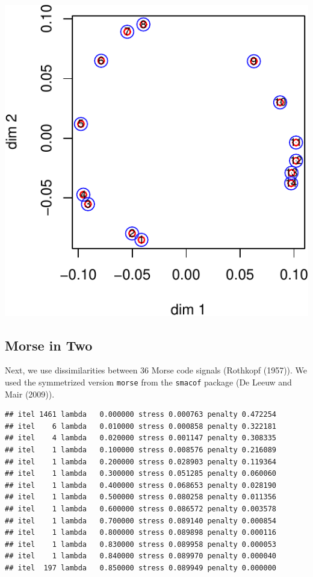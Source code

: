 \documentclass[
  12pt,
]{article}
\begin{document}
\begin{center}\includegraphics{penalty_files/figure-latex/okman-1} \end{center}

\subsection{Morse in Two}\label{morse-in-two}

Next, we use dissimilarities between 36 Morse code signals (Rothkopf
(1957)). We used the symmetrized version \texttt{morse} from the
\texttt{smacof} package (De Leeuw and Mair (2009)).

\begin{verbatim}
## itel 1461 lambda   0.000000 stress 0.000763 penalty 0.472254 
## itel    6 lambda   0.010000 stress 0.000858 penalty 0.322181 
## itel    4 lambda   0.020000 stress 0.001147 penalty 0.308335 
## itel    1 lambda   0.100000 stress 0.008576 penalty 0.216089 
## itel    1 lambda   0.200000 stress 0.028903 penalty 0.119364 
## itel    1 lambda   0.300000 stress 0.051285 penalty 0.060060 
## itel    1 lambda   0.400000 stress 0.068653 penalty 0.028190 
## itel    1 lambda   0.500000 stress 0.080258 penalty 0.011356 
## itel    1 lambda   0.600000 stress 0.086572 penalty 0.003578 
## itel    1 lambda   0.700000 stress 0.089140 penalty 0.000854 
## itel    1 lambda   0.800000 stress 0.089898 penalty 0.000116 
## itel    1 lambda   0.830000 stress 0.089958 penalty 0.000053 
## itel    1 lambda   0.840000 stress 0.089970 penalty 0.000040 
## itel  197 lambda   0.850000 stress 0.089949 penalty 0.000000
\end{verbatim}
\end{document}
